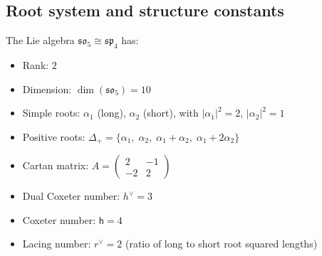 \subsection{Root system and structure constants}

\begin{computation}The Lie algebra $\mathfrak{so}_5 \cong \mathfrak{sp}_4$ has:
\begin{itemize}
\item Rank: $2$
\item Dimension: $\dim(\mathfrak{so}_5) = 10$
\item Simple roots: $\alpha_1$ (long), $\alpha_2$ (short), with
$|\alpha_1|^2 = 2$, $|\alpha_2|^2 = 1$
\item Positive roots: $\Delta_+ = \{\alpha_1,\; \alpha_2,\;
\alpha_1 + \alpha_2,\; \alpha_1 + 2\alpha_2\}$
\item Cartan matrix:
$A = \begin{pmatrix} 2 & -1 \\ -2 & 2 \end{pmatrix}$
\item Dual Coxeter number: $h^\vee = 3$
\item Coxeter number: $\mathsf{h} = 4$
\item Lacing number: $r^\vee = 2$ (ratio of long to short root squared lengths)
\end{itemize}
\end{computation}

